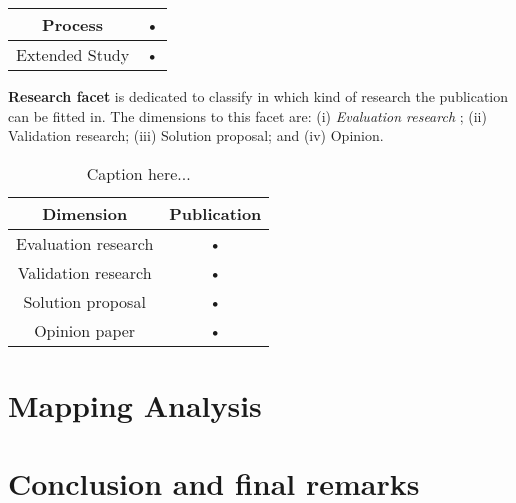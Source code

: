\documentclass[preprint,12pt]{elsarticle}
\theoremstyle{plain}
\theoremstyle{plain}
\theoremstyle{plain}
\theoremstyle{plain}
\begin{document}
\begin{description}
\begin{table}[h]
\begin{center}
\begin{tabular}{|c|c|}
\hline 
Process & • \\ 
\hline 
Extended Study & • \\ 
\hline 
\end{tabular}
\end{center}
\end{table}
\item \textbf{Research facet} is dedicated to classify in which kind of research the publication can be fitted in. The dimensions to this facet are: (i) \textit{Evaluation research} ; (ii) Validation research; (iii) Solution proposal; and (iv) Opinion.
\begin{table}[h]
\caption{Caption here...}
\begin{center}
\begin{tabular}{|c|c|}
\hline 
\textbf{Dimension} & \textbf{Publication} \\ 
\hline 
Evaluation research & • \\ 
\hline 
Validation research & • \\ 
\hline 
Solution proposal & • \\ 
\hline 
Opinion paper & • \\ 
\hline  
\end{tabular}
\end{center}
\end{table}
\end{description}


\section{Mapping Analysis}

\section{Conclusion and final remarks}



 
\end{document}
